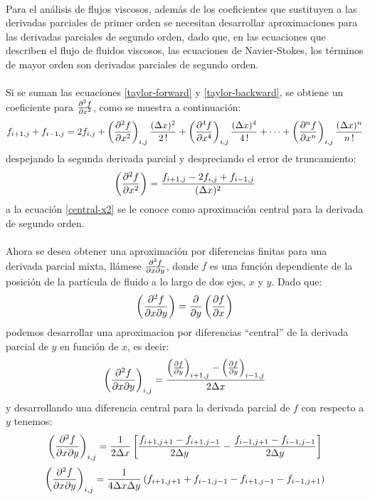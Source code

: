 \documentclass[letterpaper, openright, 12pt]{book}
\begin{document}
	\paragraph*{}
	Para el análisis de flujos viscosos, además de los coeficientes que sustituyen a las derivadas parciales de primer orden se necesitan desarrollar aproximaciones para las derivadas parciales de segundo orden, dado que, en las ecuaciones que describen el flujo de fluidos viscosos, las ecuaciones de Navier-Stokes, los términos de mayor orden son derivadas parciales de segundo orden.
	
	\paragraph*{}
	Si se suman las ecuaciones \ref{taylor-forward} y \ref{taylor-backward}, se obtiene un coeficiente para $\pdv[2]{f}{x}$, como se muestra a continuación:
	\begin{equation*}
	f_{i+1,j} + f_{i-1, j} = 2 f_{i,j} + \left( \pdv[2]{f}{x} \right)_{i,j} \frac{(\Delta x) ^2}{2\,!} + \left( \pdv[4]{f}{x} \right)_{i,j} \frac{(\Delta x)^4}{4\,!} + \dotsb + \left( \pdv[n]{f}{x} \right)_{i,j} \frac{(\Delta x)^n}{n\,!}
	\end{equation*}
	despejando la segunda derivada parcial y despreciando el error de truncamiento:
	\begin{equation}
	\left( \pdv[2]{f}{x} \right) = \frac{f_{i+1,j} - 2f_{i,j} + f_{i-1,j}}{(\Delta x)^2}
	\label{central-x2}
	\end{equation}
	a la ecuación \ref{central-x2} se le conoce como aproximación central para la derivada de segundo orden.
	
	\paragraph*{}
	Ahora se desea obtener una aproximación por diferencias finitas para una derivada parcial mixta, llámese $\pdv{f}{x}{y}$, donde $f$ es una función dependiente de la posición de la partícula de fluido a lo largo de dos ejes, $x$ y $y$. Dado que:
	\begin{equation}
	\left( \pdv{f}{x}{y} \right) = \pdv{y} \left( \pdv{f}{x} \right)
	\end{equation}
	podemos desarrollar una aproximacion por diferencias ``central'' de la derivada parcial de $y$ en función de $x$, es decir:
	\begin{equation}
	\left( \pdv{f}{x}{y} \right)_{i,j} = \frac{\left( \pdv{f}{y} \right)_{i+1, j} - \left( \pdv{f}{y} \right)_{i-1,j}}{2 \Delta x}
	\end{equation}
	y desarrollando una diferencia central para la derivada parcial de $f$ con respecto a $y$ tenemos:
	\begin{equation}
	\left( \pdv{f}{x}{y} \right)_{i,j} = \frac{1}{2 \Delta x} \left[ \frac{f_{i+1, j+1} - f_{i+1, j-1}}{2 \Delta y} - \frac{f_{i-1, j+1} - f_{i-1, j-1}}{2 \Delta y} \right]
	\end{equation}
	\begin{equation}
	\left( \pdv{f}{x}{y} \right)_{i,j} = \frac{1}{4 \Delta x \Delta y} \left( f_{i+1, j+1} + f_{i-1, j-1} - f_{i+1, j-1} - f_{i-1, j+1} \right)
	\end{equation}
	
\end{document}
